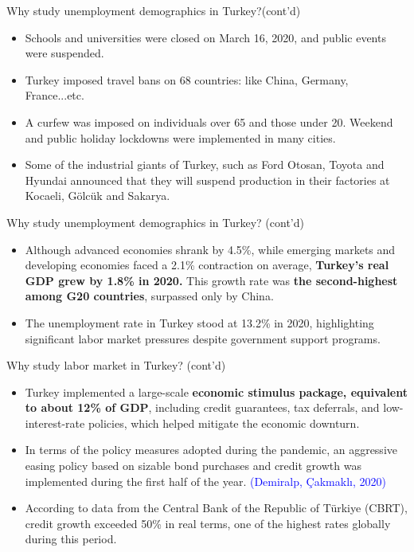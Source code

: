\documentclass[
	11pt, %
]{beamer}
\begin{document}
\begin{frame}{Why study unemployment demographics in Turkey?(cont'd)}
    \begin{itemize}
        \item Schools and universities were closed on March 16, 2020, and public events were suspended. 
        \item Turkey imposed travel bans on 68 countries: like China,  Germany, France...etc.
        \item A curfew was imposed on individuals over 65 and those under 20. Weekend and public holiday lockdowns were implemented in many cities.
        
        \item Some of the industrial giants of Turkey, such as Ford Otosan, Toyota and Hyundai announced that they will suspend production in their factories at Kocaeli, Gölcük and Sakarya. 

    \end{itemize}

    
\end{frame}

\begin{frame}{Why study unemployment demographics in Turkey? (cont'd)}
\begin{itemize}
    \item  Although advanced economies shrank by 4.5\%, while emerging markets and developing economies faced a 2.1\% contraction on average, \textbf{Turkey's real GDP grew by 1.8\% in 2020.} This growth rate was \textbf{the second-highest among G20 countries}, surpassed only by China.
    \item  The unemployment rate in Turkey stood at 13.2\% in 2020, highlighting significant labor market pressures despite government support programs.
    

\end{itemize}
\end{frame}

\begin{frame}{Why study labor market in Turkey? (cont'd)}
\begin{itemize}
    \item Turkey implemented a large-scale \textbf{economic stimulus package, equivalent to about 12\% of GDP}, including credit guarantees, tax deferrals, and low-interest-rate policies, which helped mitigate the economic downturn.
    \item In terms of the policy measures adopted during the pandemic, an aggressive easing policy based on sizable bond purchases and credit growth was implemented during the first half of the year. \textcolor{blue}{(Demiralp, Çakmaklı, 2020)}
    \item According to data from the Central Bank of the Republic of Türkiye (CBRT), credit growth exceeded 50\% in real terms, one of the highest rates globally during this period.
    
\end{itemize}
      
\end{frame}
\end{document}
